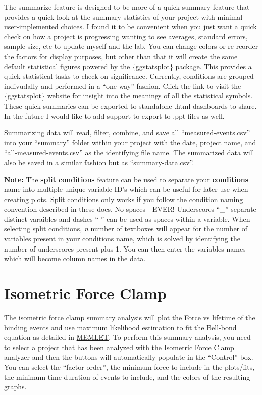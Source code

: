 \documentclass[
]{book}
\begin{document}
The summarize feature is designed to be more of a quick summary feature that provides a quick look at the summary statistics of your project with minimal user-implemented choices. I found it to be convenient when you just want a quick check on how a project is progressing wanting to see averages, standard errors, sample size, etc to update myself and the lab. You can change colors or re-reorder the factors for display purposes, but other than that it will create the same default statistical figures powered by the \href{https://indrajeetpatil.github.io/ggstatsplot/}{\{ggstatsplot\}} package. This provides a quick statistical tasks to check on significance. Currently, conditions are grouped indivudally and performed in a ``one-way'' fashion. Click the link to visit the \{ggstatsplot\} website for insight into the meanings of all the statistical symbols. These quick summaries can be exported to standalone .html dashboards to share. In the future I would like to add support to export to .ppt files as well.

Summarizing data will read, filter, combine, and save all ``measured-events.csv'' into your ``summary'' folder within your project with the date, project name, and ``all-measured-events.csv'' as the identifying file name. The summarized data will also be saved in a similar fashion but as ``summary-data.csv''.

\textbf{Note:} The \textbf{split conditions} feature can be used to separate your \textbf{conditions} name into multiple unique variable ID's which can be useful for later use when creating plots. Split conditions only works if you follow the condition naming convention described in these docs. No spaces - EVER! Underscores ``\_'' separate distinct varaibles and dashes ``-'' can be used as spaces within a variable. When selecting split conditions, \emph{n} number of textboxes will appear for the number of variables present in your conditions name, which is solved by identifying the number of underscores present plus 1. You can then enter the variables names which will become column names in the data.

\section{Isometric Force Clamp}\label{isometric-force-clamp-1}

The isometric force clamp summary analysis will plot the Force vs lifetime of the binding events and use maximum likelihood estimation to fit the Bell-bond equation as detailed in \href{https://pmc.ncbi.nlm.nih.gov/articles/PMC4968482/pdf/main.pdf}{MEMLET}. To perform this summary analysis, you need to select a project that has been analyzed with the Isometric Force Clamp analyzer and then the buttons will automatically populate in the ``Control'' box. You can select the ``factor order'', the minimum force to include in the plots/fits, the minimum time duration of events to include, and the colors of the resulting graphs.
\end{document}
